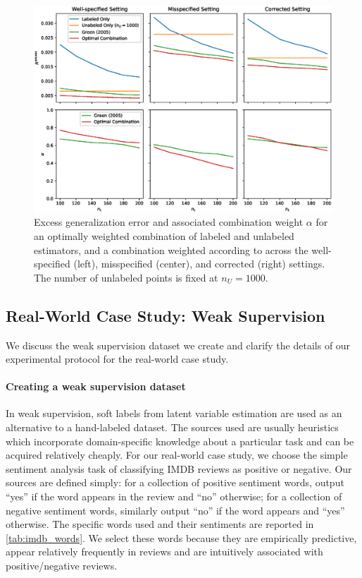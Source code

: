 \begin{figure}
    \centering
    \includegraphics[width=.6\textwidth]{eps_figures/combined_with_alphas.eps}
    \caption{Excess generalization error and associated combination weight $\alpha$ for an optimally weighted combination of labeled and unlabeled estimators, and a combination weighted according to \cite{GreenStrawderman2001} across the well-specified (left), misspecified (center), and corrected (right) settings. The number of unlabeled points is fixed at $n_U=1000$.}
    \label{fig:combined_with_alphas}
\end{figure}

\subsection{Real-World Case Study: Weak Supervision}

We discuss the weak supervision dataset we create and clarify the details of our experimental protocol for the real-world case study.

\paragraph{Creating a weak supervision dataset}

In weak supervision, soft labels from latent variable estimation are used as an alternative to a hand-labeled dataset. The sources used are usually heuristics which incorporate domain-specific knowledge about a particular task and can be acquired relatively cheaply. For our real-world case study, we choose the simple sentiment analysis task of classifying IMDB reviews as positive or negative. Our sources are defined simply: for a collection of positive sentiment words, output ``yes'' if the word appears in the review and ``no'' otherwise; for a collection of negative sentiment words, similarly output ``no'' if the word appears and ``yes'' otherwise. The specific words used and their sentiments are reported in \autoref{tab:imdb_words}. We select these words because they are empirically predictive, appear relatively frequently in reviews and are intuitively associated with positive/negative reviews.

